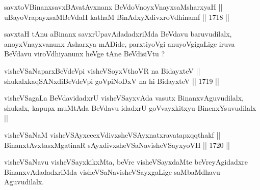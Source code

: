 
\begin{shl}
\footnotemark[2]savxtoV\s BinanxsavxBAvatAvxnanx BeVdoV\s noyxVnayxsaMsharxyaH || \\
uBayoVrapayxsaMBeVdaH kathaM BinAdxyXdivxroVdhinamf \hfill || 1718 ||  
\end{shl}

\begin{artha}
savxtaH tAnu aBinanx savxrUpavAdadadxriMda BeVdavu baruvudilalx,
anoyxVnayxvanunx Asharxya mADide, parxtiyoVgi anuyoVgigaLige iruva
BeVdavu viroVdhiyanunx heVge tAne BeVdisiVtu ?
\end{artha}


\begin{shl}
visheVSaNaparxBeVdeV\s pi visheVSoyxV\s thoVR na BidayxteV || \\
shukalxkaqSANxdiBeVdeV\s pi goVpiNoDxV na hi BidayxteV \hfill || 1719 ||  
\end{shl}

\begin{artha}
visheVSagaLa BeVdavidadxrU visheVSayxvAda vasutx BinanxvAguvudilalx,
shukalx, kapupx muMtAda BeVdavu idadxrU goVvayxkitxyu BinenxYsuvudilalx ||
\end{artha}


\begin{shl}
\footnotemark[1]visheVSaNaM visheVSAyxcecxVdivxsheVSAyxnatxravatapxqqthakf || \\
BinanxtAvxtasxMgatinaR sAyxdivxsheVSaNavisheVSayxyoVH \hfill || 1720 ||  
\end{shl}

\begin{artha}
visheVSaNavu visheVSayxkikxMta, beVre visheVSayxdaMte
beVreyAgidadxre BinanxvAdadadxriMda visheVSaNavisheVSayxgaLige
saMbaMdhavu Aguvudilalx.
\end{artha}

